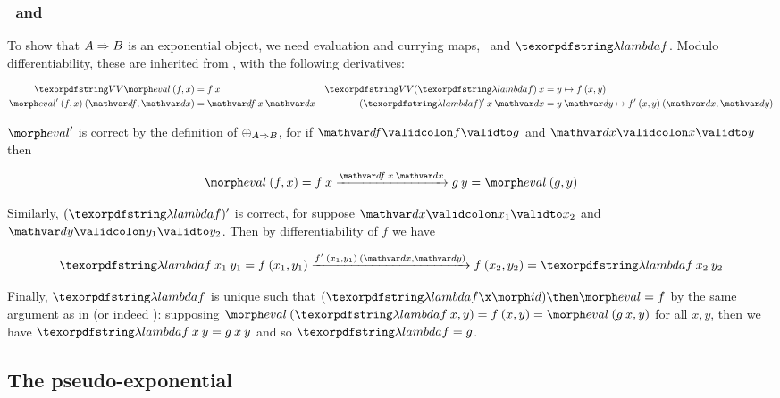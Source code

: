 
\subsubsection{\texorpdfstring{\boldmath}{}\eval\ and \fn}

To show that $A \Rightarrow B$ is an exponential object, we need evaluation and
currying maps, \eval\ and $\fn f$. Modulo differentiability, these are
inherited from \Poset{}, with the following derivatives:

\begin{align*}
  \vals{\eval} \<(f,x) &= f\<x &
  \vals{(\fn f)} \<x &= y \mapsto f\<(x,y)\\
  \deriv{\eval} \<(f,x) \<(\df,\dx) &= \df \<x \<\dx &
  \deriv{(\fn f)} \<x \<\dx &= y\<\dy \mapsto \deriv f \<(x,y) \<(\dx,\dy)
\end{align*}

\noindent
$\deriv{\eval}$ is correct by the definition of ${\mathbin{\oplus}}_{A \Rightarrow B}$, for if
$\valid\df f g$ and $\valid\dx x y$ then

\nopagebreak[2]
\[ \eval\<(f,x) = {f\<x} \longvalidto{\df\<x\<\dx} {g\<y} = \eval\<(g,y) \]

\noindent
Similarly, \(\deriv{(\fn f)}\) is correct, for suppose $\valid\dx {x_1}{x_2}$
and $\valid\dy{y_1}{y_2}$. Then by differentiability of $f$ we have

\nopagebreak[2]
\[ \fn f \<x_1 \<y_1 =
f\<(x_1,y_1) \longvalidto{\deriv f \<(x_1,y_1) \<(\dx,\dy)} f\<(x_2,y_2)
= \fn f \<x_2 \<y_2
\]

\noindent
Finally, $\fn f$ is unique such that $(\fn f \x \id) \then \eval = f$ by the
same argument as in \Poset{} (or indeed ): supposing $\eval \<(\fn f
\<x, y) = f\<(x,y) = \eval\<(g\<x,y)$ for all $x,y$, then we have $\fn f \<x \<
y = g \<x \<y$ and so $\fn f = g$.


\subsection{The pseudo-exponential}

\newcommand\pseudoexp{\rightrightarrows}

